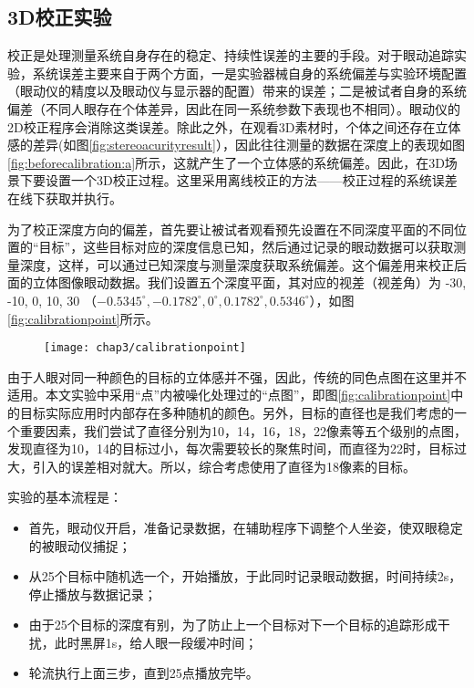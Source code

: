 \subsection{3D校正实验}
\label{sec:3dcalibrationexperiment}
校正是处理测量系统自身存在的稳定、持续性误差的主要的手段。对于眼动追踪实验，系统误差主要来自于两个方面，一是实验器械自身的系统偏差与实验环境配置（眼动仪的精度以及眼动仪与显示器的配置）带来的误差；二是被试者自身的系统偏差（不同人眼存在个体差异，因此在同一系统参数下表现也不相同）。眼动仪的2D校正程序会消除这类误差。除此之外，在观看3D素材时，个体之间还存在立体感的差异(如图\ref{fig:stereoacurityresult}），因此往往测量的数据在深度上的表现如图\ref{fig:beforecalibration:a}所示，这就产生了一个立体感的系统偏差。因此，在3D场景下要设置一个3D校正过程。这里采用离线校正的方法——校正过程的系统误差在线下获取并执行。

为了校正深度方向的偏差，首先要让被试者观看预先设置在不同深度平面的不同位置的“目标”，这些目标对应的深度信息已知，然后通过记录的眼动数据可以获取测量深度，这样，可以通过已知深度与测量深度获取系统偏差。这个偏差用来校正后面的立体图像眼动数据。我们设置五个深度平面，其对应的视差（视差角）为 -30, -10, 0, 10, 30  （$ -{0.5345^\circ }, -{0.1782^\circ }, {0^\circ }, {0.1782^\circ }, {0.5346^\circ }$），如图\ref{fig:calibrationpoint}所示。
\begin{figure}[!htp]
  \centering
  \texttt{[image: chap3/calibrationpoint]}
\end{figure}
由于人眼对同一种颜色的目标的立体感并不强\parencite{holliman2007application}，因此，传统的同色点图在这里并不适用。本文实验中采用“点”内被噪化处理过的“点图”，即图\ref{fig:calibrationpoint}中的目标实际应用时内部存在多种随机的颜色。另外，目标的直径也是我们考虑的一个重要因素，我们尝试了直径分别为10，14，16，18，22像素等五个级别的点图，发现直径为10，14的目标过小，每次需要较长的聚焦时间，而直径为22时，目标过大，引入的误差相对就大。所以，综合考虑使用了直径为18像素的目标。

实验的基本流程是：
\begin{itemize}[noitemsep,topsep=0pt,parsep=0pt,partopsep=0pt]
\item 首先，眼动仪开启，准备记录数据，在辅助程序下调整个人坐姿，使双眼稳定的被眼动仪捕捉；
\item 从25个目标中随机选一个，开始播放，于此同时记录眼动数据，时间持续2s，停止播放与数据记录；
\item 由于25个目标的深度有别，为了防止上一个目标对下一个目标的追踪形成干扰，此时黑屏1s，给人眼一段缓冲时间；
\item 轮流执行上面三步，直到25点播放完毕。
\end{itemize}

